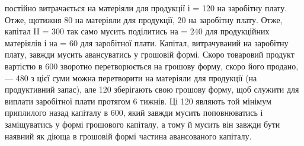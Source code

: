 \parcont{}  %
постійно витрачається на матеріяли для продукції і  = 120
на заробітну плату. Отже, щотижня 80 на матеріяли для продукції,
20 на заробітну плату. Отже, капітал II = 300
так само мусить поділитись на  = 240 для продукційних матеріялів
і на  = 60 для заробітної плати. Капітал, витрачуваний
на заробітну плату, завжди мусить авансуватись у грошовій формі.
Скоро товаровий продукт вартістю в 600 зворотно перетворюється
на грошову форму, скоро його продано, — 480 з цієї
суми можна перетворити на матеріяли для продукції (на продуктивний
запас), але 120 зберігають свою грошову форму, щоб служити
для виплати заробітної плати протягом 6 тижнів. Ці 120 являють
той мінімум приплилого назад капіталу в 600, який завжди
мусить поповнюватись і заміщуватись у формі грошового капіталу, а
тому й мусить він завжди бути наявний як діюща в грошовій формі частина
авансованого капіталу.

